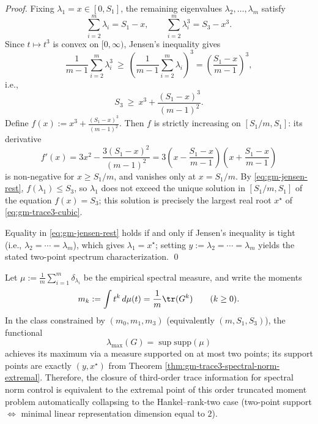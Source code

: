 \begin{proof}
Fixing \(\lambda_1=x\in[0,S_1]\), the remaining eigenvalues \(\lambda_2,\dots,\lambda_m\) satisfy
\[
\sum_{i=2}^m \lambda_i=S_1-x,\qquad \sum_{i=2}^m \lambda_i^3=S_3-x^3.
\]
Since \(t\mapsto t^3\) is convex on \([0,\infty)\), Jensen's inequality gives
\[
\frac{1}{m-1}\sum_{i=2}^m \lambda_i^3\ \ge\ \left(\frac{1}{m-1}\sum_{i=2}^m \lambda_i\right)^3
=\left(\frac{S_1-x}{m-1}\right)^3,
\]
i.e.,
\begin{equation}\label{eq:gm-jensen-rest}
S_3\ \ge\ x^3+\frac{(S_1-x)^3}{(m-1)^2}.
\end{equation}
Define
\(
f(x):=x^3+\frac{(S_1-x)^3}{(m-1)^2}
\).
Then \(f\) is strictly increasing on \([S_1/m,S_1]\): its derivative
\[
f'(x)=3x^2-\frac{3(S_1-x)^2}{(m-1)^2}
=3\left(x-\frac{S_1-x}{m-1}\right)\left(x+\frac{S_1-x}{m-1}\right)
\]
is non-negative for \(x\ge S_1/m\), and vanishes only at \(x=S_1/m\).
By \eqref{eq:gm-jensen-rest}, \(f(\lambda_1)\le S_3\), so \(\lambda_1\) does not exceed the unique solution in \([S_1/m,S_1]\) of the equation \(f(x)=S_3\); this solution is precisely the largest real root \(x^\star\) of \eqref{eq:gm-trace3-cubic}.

Equality in \eqref{eq:gm-jensen-rest} holds if and only if Jensen's inequality is tight (i.e., \(\lambda_2=\cdots=\lambda_m\)), which gives \(\lambda_1=x^\star\); setting \(y:=\lambda_2=\cdots=\lambda_m\) yields the stated two-point spectrum characterization. \qed
\end{proof}

\begin{proposition}\label{prop:gm-trace3-truncated-moment-rank2}
Let \(\mu:=\frac1m\sum_{i=1}^m\delta_{\lambda_i}\) be the empirical spectral measure, and write the moments
\[
m_k:=\int t^k\,d\mu(t)=\frac1m\tr(G^k)\qquad(k\ge 0).
\]
In the class constrained by \((m_0,m_1,m_3)\) (equivalently \((m,S_1,S_3)\)), the functional
\[
\lambda_{\max}(G)=\sup\mathrm{supp}(\mu)
\]
achieves its maximum via a measure supported on at most two points; its support points are exactly \((y,x^\star)\) from Theorem \ref{thm:gm-trace3-spectral-norm-extremal}.
Therefore, the closure of third-order trace information for spectral norm control is equivalent to the extremal point of this order truncated moment problem automatically collapsing to the Hankel--rank-two case (two-point support \(\Longleftrightarrow\) minimal linear representation dimension equal to \(2\)).
\end{proposition}

